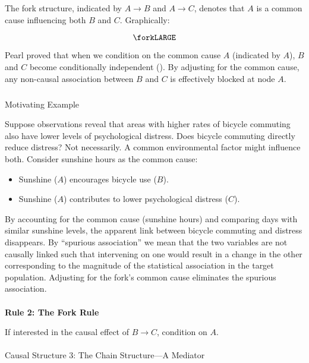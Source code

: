\documentclass[
  singlecolumn]{article}
\makeatletter
\let\oldparagraph\paragraph
\renewcommand{\paragraph}{
    \@ifstar
      \xxxParagraphStar
      \xxxParagraphNoStar
  }
\newcommand{\xxxParagraphStar}[1]{\oldparagraph*{#1}\mbox{}}
\newcommand{\xxxParagraphNoStar}[1]{\oldparagraph{#1}\mbox{}}
\let\oldsubparagraph\subparagraph
\renewcommand{\subparagraph}{
    \@ifstar
      \xxxSubParagraphStar
      \xxxSubParagraphNoStar
  }
\newcommand{\xxxSubParagraphStar}[1]{\oldsubparagraph*{#1}\mbox{}}
\newcommand{\xxxSubParagraphNoStar}[1]{\oldsubparagraph{#1}\mbox{}}
\providecommand{\tightlist}{%
  \setlength{\itemsep}{0pt}\setlength{\parskip}{0pt}}\usepackage{longtable,booktabs,array}
\makeatother
\begin{document}
The fork structure, indicated by \(A \rightarrow B\) and
\(A \rightarrow C\), denotes that \(A\) is a common cause influencing
both \(B\) and \(C\). Graphically:

\[
\forkLARGE
\]

Pearl proved that when we condition on the common cause \(A\) (indicated
by \(\boxed{A}\)), \(B\) and \(C\) become conditionally independent
(). By adjusting for the common
cause, any non-causal association between \(B\) and \(C\) is effectively
blocked at node \(A\).

\subparagraph{Motivating Example}\label{motivating-example-1}

Suppose observations reveal that areas with higher rates of bicycle
commuting also have lower levels of psychological distress. Does bicycle
commuting directly reduce distress? Not necessarily. A common
environmental factor might influence both. Consider sunshine hours as
the common cause:

\begin{itemize}
\tightlist
\item
  Sunshine (\(A\)) encourages bicycle use (\(B\)).
\item
  Sunshine (\(A\)) contributes to lower psychological distress (\(C\)).
\end{itemize}

By accounting for the common cause (sunshine hours) and comparing days
with similar sunshine levels, the apparent link between bicycle
commuting and distress disappears. By ``spurious association'' we mean
that the two variables are not causally linked such that intervening on
one would result in a change in the other corresponding to the magnitude
of the statistical association in the target population. Adjusting for
the fork's common cause eliminates the spurious association.

\paragraph{\texorpdfstring{\textbf{Rule 2: The Fork
Rule}}{Rule 2: The Fork Rule}}\label{rule-2-the-fork-rule}

If interested in the causal effect of \(B \to C\), condition on
\(\boxed{A}\).

\paragraph{Causal Structure 3: The Chain Structure---A
Mediator}\label{causal-structure-3-the-chain-structurea-mediator}
\end{document}
